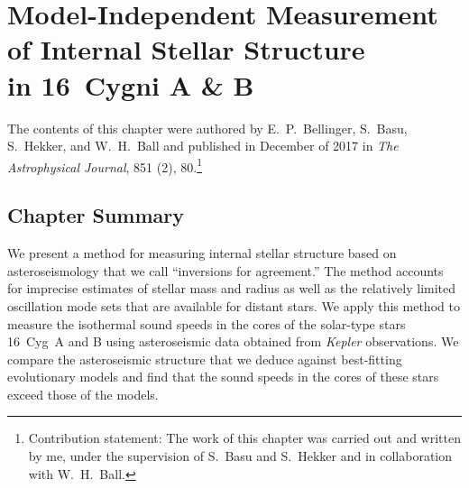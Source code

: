 \iffalse
\begin{savequote}[0.5\textwidth]
``At first sight it would seem that the deep interior of the sun and stars is less accessible to scientific investigation than any other region of the universe. Our telescopes may probe farther and farther into the depths of space; but how can we ever obtain certain knowledge of that which is hidden behind substantial barriers? What appliance can pierce through the outer layers of a star and test the conditions within?''
\qauthor{Sir Arthur Stanley Eddington\\
\emph{The Internal Constitution of Stars} (1926)}
\end{savequote}
\fi
\chapter{Model-Independent Measurement of Internal Stellar Structure \\in 16~Cygni A \& B}
\label{chap:inversion}

\vspace{2cm}
The contents of this chapter were authored by E.~P.~Bellinger, S.~Basu, S.~Hekker, and W.~H.~Ball and published in December of 2017 in \emph{The Astrophysical Journal}, 851 (2), 80.\footnote{Contribution statement: The work of this chapter was carried out and written by me, under the supervision of S.~Basu and S.~Hekker and in collaboration with W.~H.~Ball. } 
\nocite{2017ApJ...851...80B}

\vspace*{1cm}

\section*{Chapter Summary}
We present a method for measuring internal stellar structure based on asteroseismology that we call ``inversions for agreement.'' 
The method accounts for imprecise estimates of stellar mass and radius as well as the relatively limited oscillation mode sets that are available for distant stars. 
We apply this method to measure the isothermal sound speeds in the cores of the solar-type stars 16~Cyg~A and B using asteroseismic data obtained from \emph{Kepler} observations. 
We compare the asteroseismic structure that we deduce against best-fitting evolutionary models and find that the sound speeds in the cores of these stars exceed those of the models. 
\newpage
